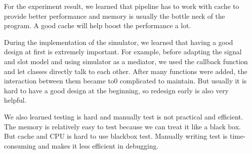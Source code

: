 \documentclass{sig-alternate}
\begin{document}
For the experiment result, we learned that pipeline has to work with cache to provide better performance and memory is usually the bottle neck of the program. A good cache will help boost the performance a lot. 

During the implementation of the simulator, we learned that having a good design at first is extremely important. For example, before adapting the signal and slot model and using simulator as a mediator, we used the callback function and let classes directly talk to each other. After many functions were added, the interaction between them became to0 complicated to maintain. But usually it is hard to have a good design at the beginning, so redesign early is also very helpful. 

We also learned testing is hard and manually test is not practical and efficient. The memory is relatively easy to test because we can treat it like a black box. But cache and CPU is hard to use blackbox test. Manually writing test is time-consuming and makes it less efficient in debugging.
\end{document}
